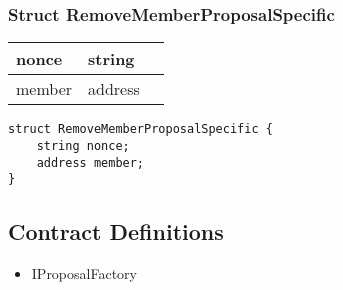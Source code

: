 \subsubsection{Struct RemoveMemberProposalSpecific}


\ifsoltables
\noindent\begin{tabular}{|l|l|p{6cm}|}\hline
nonce & string & \\\hline
member & address & \\\hline
\end{tabular}
\fi


\begin{lstlisting}[firstnumber=11]
struct RemoveMemberProposalSpecific {
    string nonce;
    address member;
}
\end{lstlisting}

\subsection{Contract Definitions}

\begin{itemize}
\item IProposalFactory
\end{itemize}
